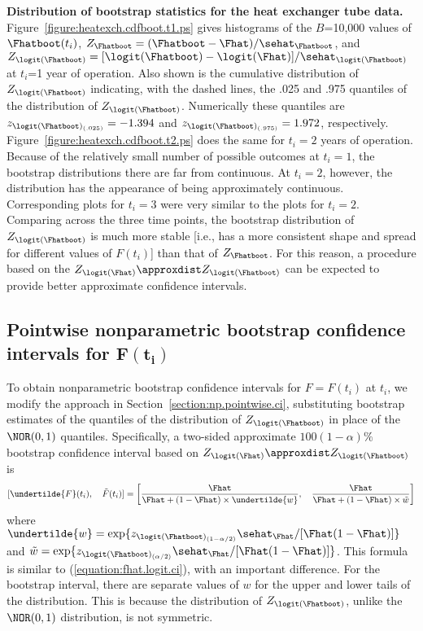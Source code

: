 \begin{example}
{\bf Distribution of bootstrap statistics for the heat exchanger
tube data.}
Figure~\ref{figure:heatexch.cdfboot.t1.ps} gives histograms of the
$B$=10,000 values of $\Fhatboot(t_{i})$,
$Z_{\Fhatboot}=(\Fhatboot-\Fhat)/
\sehat_{\Fhatboot}$, and
$Z_{\logit(\Fhatboot)}=
[\logit(\Fhatboot)-\logit(\Fhat)]/
\sehat_{\logit(\Fhatboot)}$
at $t_{i}$=1 year of operation. Also shown is the cumulative
distribution of $Z_{\logit(\Fhatboot)}$ indicating, with the dashed
lines, the .025 and .975 quantiles of the distribution of
$Z_{\logit(\Fhatboot)}$. Numerically these quantiles are
$z_{\logit(\Fhatboot)_{(.025)}} = -1.394$ and
$z_{\logit(\Fhatboot)_{(.975)}}=1.972$, respectively.
Figure~\ref{figure:heatexch.cdfboot.t2.ps} does the same for
$t_{i}=2$ years of operation.  Because of the relatively small
number of possible outcomes at $t_{i}=1$, the bootstrap
distributions there are far from continuous.  At $t_{i}=2$, however,
the distribution has the appearance of being approximately
continuous. Corresponding plots for $t_{i}=3$ were very similar to
the plots for $t_{i}=2$.  Comparing across the three time points, the bootstrap
distribution of $Z_{\logit(\Fhatboot)}$ is much more stable [i.e.,
has a more consistent shape and spread for different values of
$F(t_{i})$] than that of $Z_{\Fhatboot}$. For this reason, a
procedure based on the $Z_{\logit(\Fhat)} \approxdist
Z_{\logit(\Fhatboot)}$ can be expected to provide better approximate
confidence intervals.
\end{example}


\subsection{Pointwise nonparametric bootstrap confidence 
intervals for $\boldsymbol{F(t_{i})}$} 
\label{section:pointwise.np.boot}
To obtain nonparametric bootstrap confidence 
intervals for $F=F(t_{i})$ at $t_{i}$, we modify the
approach in Section~\ref{section:np.pointwise.ci},
substituting bootstrap estimates of the quantiles of
the distribution of $Z_{\logit(\Fhatboot)}$ in place of the
$\NOR(0,1)$ quantiles.
Specifically, a two-sided approximate $100(1-\alpha)\%$ 
bootstrap confidence interval based on 
$Z_{\logit(\Fhat)} \approxdist Z_{\logit(\Fhatboot)}$
is
\begin{equation}
\label{equation:fhat.logit.boot.ci}
[\undertilde{F}(t_{i}), \quad \tilde{F}(t_{i})] = 
\left[\frac{\Fhat}{\Fhat
+(1-\Fhat) \times \undertilde{w}},  \quad \frac{\Fhat}{\Fhat+
(1-\Fhat) \times \tilde{w}}
\right]
\end{equation}
where
$\undertilde{w}=\exp\{z_{\logit(\Fhatboot)_{(1-\alpha/2)}}\sehat_{\Fhat}/
[\Fhat(1-\Fhat)]\}$ and
$\tilde{w}=\exp\{z_{\logit(\Fhatboot)_{(\alpha/2)}}\sehat_{\Fhat}/
[\Fhat(1-\Fhat)]\}$.  This formula is similar to
(\ref{equation:fhat.logit.ci}), with an important difference. For
the bootstrap interval, there are separate values of $w$ for the
upper and lower tails of the distribution. This is because the
distribution of $Z_{\logit(\Fhatboot)}$, unlike the $\NOR(0,1)$
distribution, is not symmetric.

